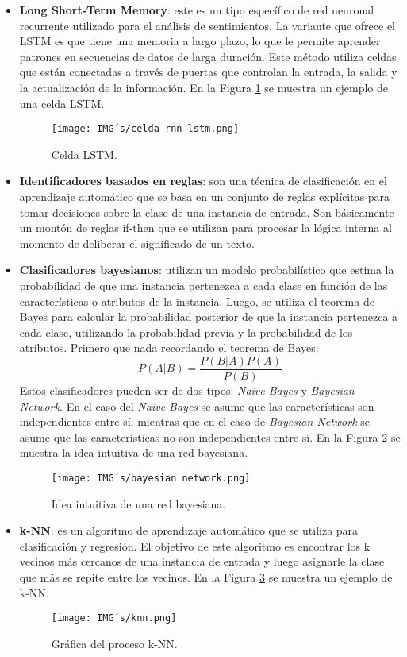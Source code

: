 \documentclass[12pt, conference]{IEEEtran}
\begin{document}
\begin{itemize}
  \item \textbf{Long Short-Term Memory}: este es un tipo específico de red neuronal recurrente utilizado para el análisis de sentimientos. La variante que ofrece el LSTM es que tiene una memoria a largo plazo, lo que le permite aprender patrones en secuencias de datos de larga duración. Este método utiliza celdas que están conectadas a través de puertas que controlan la entrada, la salida y la actualización de la información. En la Figura \ref{fig17} se muestra un ejemplo de una celda LSTM.
  \begin{figure}
    \centering
    \texttt{[image: IMG´s/celda rnn lstm.png]}
    \caption{Celda LSTM.}
    \label{fig17}
  \end{figure}

  \item \textbf{Identificadores basados en reglas}: son una técnica de clasificación en el aprendizaje automático que se basa en un conjunto de reglas explícitas para tomar decisiones sobre la clase de una instancia de entrada. Son básicamente un montón de reglas if-then que se utilizan para procesar la lógica interna al momento de deliberar el significado de un texto. 
  \item \textbf{Clasificadores bayesianos}: utilizan un modelo probabilístico que estima la probabilidad de que una instancia pertenezca a cada clase en función de las características o atributos de la instancia. Luego, se utiliza el teorema de Bayes para calcular la probabilidad posterior de que la instancia pertenezca a cada clase, utilizando la probabilidad previa y la probabilidad de los atributos. Primero que nada recordando el teorema de Bayes:
  \begin{equation}
    P(A|B) = \frac{P(B|A)P(A)}{P(B)}
  \end{equation}
  Estos clasificadores pueden ser de dos tipos: \textit{Naive Bayes} y \textit{Bayesian Network}. En el caso del \textit{Naive Bayes} se asume que las características son independientes entre sí, mientras que en el caso de \textit{Bayesian Network} se asume que las características no son independientes entre sí. En la Figura \ref{fig18} se muestra la idea intuitiva de una red bayesiana.
  \begin{figure}
    \centering
    \texttt{[image: IMG´s/bayesian network.png]}
    \caption{Idea intuitiva de una red bayesiana.}
    \label{fig18}
  \end{figure}

  \item \textbf{k-NN}: es un algoritmo de aprendizaje automático que se utiliza para clasificación y regresión. El objetivo de este algoritmo es encontrar los k vecinos más cercanos de una instancia de entrada y luego asignarle la clase que más se repite entre los vecinos. En la Figura \ref{fig19} se muestra un ejemplo de k-NN.
  \begin{figure}
    \centering
    \texttt{[image: IMG´s/knn.png]}
    \caption{Gráfica del proceso k-NN.}
    \label{fig19}
  \end{figure}
\end{itemize}
\end{document}
